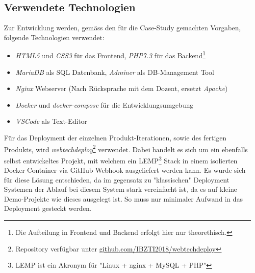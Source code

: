 \subsection{Verwendete Technologien}

Zur Entwicklung werden, gemäss den für die Case-Study gemachten Vorgaben, folgende Technologien verwendet:

\begin{itemize}
  \item \emph{HTML5} und \emph{CSS3} für das Frontend, \emph{PHP7.3} für das Backend\footnote{Die Aufteilung in Frontend und Backend erfolgt hier nur theorethisch.}
  \item \emph{MariaDB} als SQL Datenbank, \emph{Adminer} als DB-Management Tool
  \item \emph{Nginx} Webserver (Nach Rücksprache mit dem Dozent, ersetzt \emph{Apache})
  \item \emph{Docker} und \emph{docker-compose} für die Entwicklungsumgebung
  \item \emph{VSCode} als Text-Editor
\end{itemize}

\noindent
Für das Deployment der einzelnen Produkt-Iterationen, sowie des fertigen Produkts, wird \emph{webtechdeploy}\footnote{Repository verfügbar unter \href{https://github.com/IBZTI2018/webtechdeploy}{github.com/IBZTI2018/webtechdeploy}} verwendet.
Dabei handelt es sich um ein ebenfalls selbst entwickeltes Projekt, mit welchem ein LEMP\footnote{LEMP ist ein Akronym für "Linux + nginx + MySQL + PHP"} Stack in einem isolierten Docker-Container via GitHub Webhook ausgeliefert werden kann.
Es wurde sich für diese Lösung entschieden, da im gegensatz zu "klassischen" Deployment Systemen der Ablauf bei diesem System stark vereinfacht ist, da es auf kleine Demo-Projekte wie dieses ausgelegt ist. So muss nur minimaler Aufwand in das Deployment gesteckt werden.
